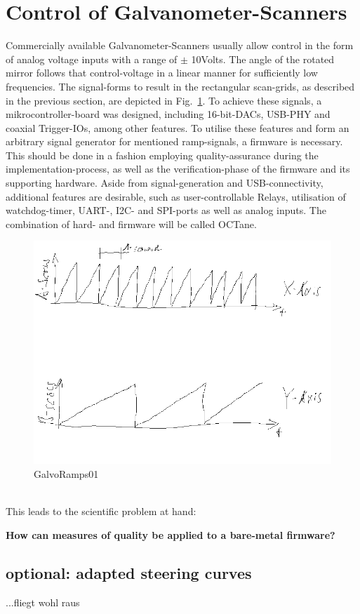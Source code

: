 \section{Control of Galvanometer-Scanners}
Commercially available Galvanometer-Scanners usually allow control in the form of analog voltage inputs with a range of $\pm$ 10Volts. The angle of the rotated mirror follows that control-voltage in a linear manner for sufficiently low frequencies. The signal-forms to result in the rectangular scan-grids, as described in the previous section, are depicted in Fig.~\ref{GalvoRamps01}. To achieve these signals, a mikrocontroller-board was designed, including 16-bit-DACs, USB-PHY and coaxial Trigger-IOs, among other features. To utilise these features and form an arbitrary signal generator for mentioned ramp-signals, a firmware is necessary. This should be done in a fashion employing quality-assurance during the implementation-process, as well as the verification-phase of the firmware and its supporting hardware. Aside from signal-generation and USB-connectivity, additional features are desirable, such as user-controllable Relays, utilisation of watchdog-timer, UART-, I2C- and SPI-ports as well as analog inputs. The combination of hard- and firmware will be called OCTane.
\begin{figure}[h!]	\centering	\includegraphics[width=\textwidth]{images/GalvoRamps01.png}	\caption{GalvoRamps01}	\label{GalvoRamps01}	\end{figure}
 \\
This leads to the scientific problem at hand: 
\begin{center} {\bf How can measures of quality be applied to a bare-metal firmware?}
\end{center}
\subsection{optional: adapted steering curves}
...fliegt wohl raus
